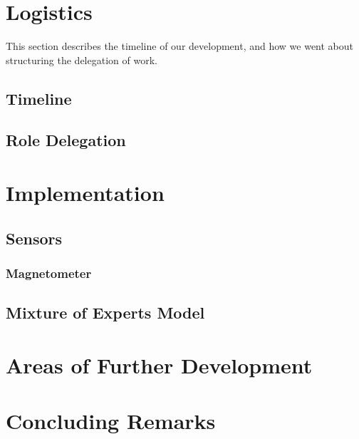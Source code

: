 \documentclass{article}
\begin{document}
\section{Logistics}%
\label{sec:logistics}

This section describes the timeline of our development, and how we went about structuring the delegation of work.

\subsection{Timeline}%
\label{subsec:timeline}


\subsection{Role Delegation}%
\label{subsec:delegation}

\section{Implementation}%
\label{sec:implementation}



\subsection{Sensors}%
\label{subsec:sensors}

\subsubsection{Magnetometer}

\subsubsection{}

\subsection{Mixture of Experts Model}%
\label{subsec:moe}

\section{Areas of Further Development}%
\label{sec:development}

\section{Concluding Remarks}%
\label{sec:conclusion}
\end{document}

